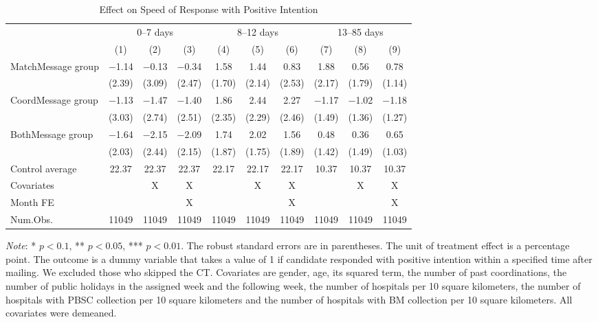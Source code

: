 \documentclass[12pt, a4paper]{article}
\begin{document}
\begin{table}[H]

\caption{\label{tab:lm-positive-time-decompose}Effect on Speed of Response with Positive Intention}
\centering
\fontsize{8}{10}\selectfont
\begin{threeparttable}
\begin{tabular}[t]{>{\raggedright\arraybackslash}p{20em}ccccccccc}
\toprule
\multicolumn{1}{c}{ } & \multicolumn{3}{c}{0--7 days} & \multicolumn{3}{c}{8--12 days} & \multicolumn{3}{c}{13--85 days} \\
\cmidrule(l{3pt}r{3pt}){2-4} \cmidrule(l{3pt}r{3pt}){5-7} \cmidrule(l{3pt}r{3pt}){8-10}
  & (1) & (2) & (3) & (4) & (5) & (6) & (7) & (8) & (9)\\
\midrule
MatchMessage group & \num{-1.14} & \num{-0.13} & \num{-0.34} & \num{1.58} & \num{1.44} & \num{0.83} & \num{1.88} & \num{0.56} & \num{0.78}\\
 & (\num{2.39}) & (\num{3.09}) & (\num{2.47}) & (\num{1.70}) & (\num{2.14}) & (\num{2.53}) & (\num{2.17}) & (\num{1.79}) & (\num{1.14})\\
CoordMessage group & \num{-1.13} & \num{-1.47} & \num{-1.40} & \num{1.86} & \num{2.44} & \num{2.27} & \num{-1.17} & \num{-1.02} & \num{-1.18}\\
 & (\num{3.03}) & (\num{2.74}) & (\num{2.51}) & (\num{2.35}) & (\num{2.29}) & (\num{2.46}) & (\num{1.49}) & (\num{1.36}) & (\num{1.27})\\
BothMessage group & \num{-1.64} & \num{-2.15} & \num{-2.09} & \num{1.74} & \num{2.02} & \num{1.56} & \num{0.48} & \num{0.36} & \num{0.65}\\
 & (\num{2.03}) & (\num{2.44}) & (\num{2.15}) & (\num{1.87}) & (\num{1.75}) & (\num{1.89}) & (\num{1.42}) & (\num{1.49}) & (\num{1.03})\\
\midrule
Control average & 22.37 & 22.37 & 22.37 & 22.17 & 22.17 & 22.17 & 10.37 & 10.37 & 10.37\\
Covariates &  & X & X &  & X & X &  & X & X\\
Month FE &  &  & X &  &  & X &  &  & X\\
Num.Obs. & \num{11049} & \num{11049} & \num{11049} & \num{11049} & \num{11049} & \num{11049} & \num{11049} & \num{11049} & \num{11049}\\
\bottomrule
\end{tabular}
\begin{tablenotes}
\item \emph{Note}: * $p < 0.1$, ** $p < 0.05$, *** $p < 0.01$. The robust standard errors are in parentheses. The unit of treatment effect is a percentage point. The outcome is a dummy variable that takes a value of 1 if candidate responded with positive intention within a specified time after mailing. We excluded those who skipped the CT. Covariates are gender, age, its squared term, the number of past coordinations, the number of public holidays in the assigned week and the following week, the number of hospitals per 10 square kilometers, the number of hospitals with PBSC collection per 10 square kilometers and the number of hospitals with BM collection per 10 square kilometers. All covariates were demeaned.

\end{tablenotes}
\end{threeparttable}
\end{table}
\end{document}
